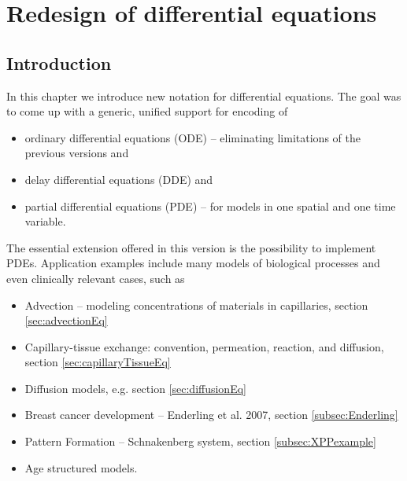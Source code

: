 \chapter{Redesign of differential equations}
\label{ch:DEs}

\section{Introduction}
In this chapter we introduce new notation for differential equations. 
The goal was to come up with a generic, unified support for encoding of 
\begin{itemize}
\item 
ordinary differential equations (ODE) -- eliminating limitations of the previous
versions and
\item 
delay differential equations (DDE) and
\item
partial differential equations (PDE) -- for models in one spatial and one time variable.	
\end{itemize}

\smallskip
The essential extension offered in this version is the possibility to 
implement PDEs. Application examples include many models of biological 
processes and even clinically relevant cases, such as
\begin{itemize}
\item 
Advection -- modeling concentrations of materials in capillaries, section \ref{sec:advectionEq}
\item 
Capillary-tissue exchange: convention, permeation, reaction, and diffusion, section \ref{sec:capillaryTissueEq}
\item 
Diffusion models, e.g. section \ref{sec:diffusionEq}
\item
Breast cancer development -- Enderling et al. 2007, section \ref{subsec:Enderling}
\item
Pattern Formation -- Schnakenberg system, section \ref{subsec:XPPexample}
\item 
Age structured models.
\end{itemize}

